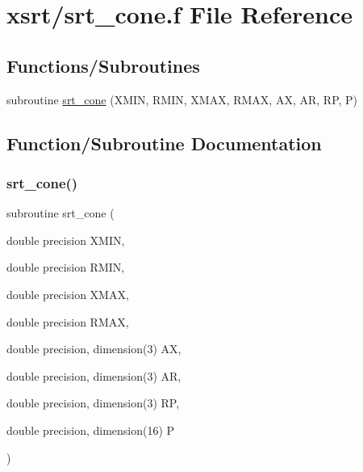 \hypertarget{srt__cone_8f}{}\section{xsrt/srt\+\_\+cone.f File Reference}
\label{srt__cone_8f}
\subsection*{Functions/\+Subroutines}
\begin{DoxyCompactItemize}
\item 
subroutine \hyperlink{srt__cone_8f_aa77dac84d978262eb1b17b6b0399e891}{srt\+\_\+cone} (X\+M\+IN, R\+M\+IN, X\+M\+AX, R\+M\+AX, AX, AR, RP, P)
\end{DoxyCompactItemize}


\subsection{Function/\+Subroutine Documentation}
\mbox{\label{srt__cone_8f_aa77dac84d978262eb1b17b6b0399e891}} 
\subsubsection{\texorpdfstring{srt\+\_\+cone()}{srt\_cone()}}
{\footnotesize\ttfamily subroutine srt\+\_\+cone (\begin{DoxyParamCaption}\item[{double precision}]{X\+M\+IN,  }\item[{double precision}]{R\+M\+IN,  }\item[{double precision}]{X\+M\+AX,  }\item[{double precision}]{R\+M\+AX,  }\item[{double precision, dimension(3)}]{AX,  }\item[{double precision, dimension(3)}]{AR,  }\item[{double precision, dimension(3)}]{RP,  }\item[{double precision, dimension(16)}]{P }\end{DoxyParamCaption})}

